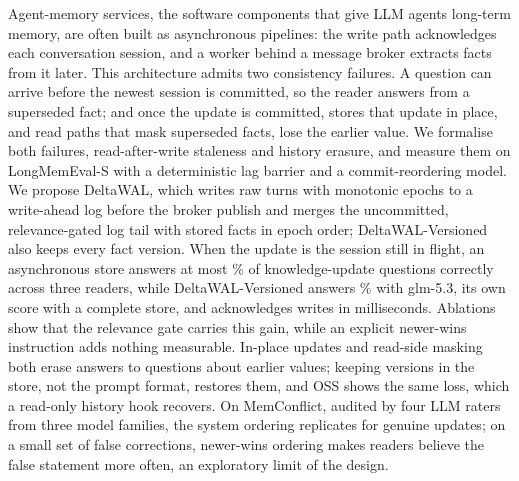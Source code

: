 Agent-memory services, the software components that give LLM agents long-term memory, are often built as asynchronous pipelines: the write path acknowledges each conversation session, and a worker behind a message broker extracts facts from it later. This architecture admits two consistency failures. A question can arrive before the newest session is committed, so the reader answers from a superseded fact; and once the update is committed, stores that update in place, and read paths that mask superseded facts, lose the earlier value. We formalise both failures, read-after-write staleness and history erasure, and measure them on LongMemEval-S with a deterministic lag barrier and a commit-reordering model. We propose DeltaWAL, which writes raw turns with monotonic epochs to a write-ahead log before the broker publish and merges the uncommitted, relevance-gated log tail with stored facts in epoch order; DeltaWAL-Versioned also keeps every fact version. When the update is the session still in flight, an asynchronous store answers at most \% of knowledge-update questions correctly across three readers, while DeltaWAL-Versioned answers \% with glm-5.3, its own score with a complete store, and acknowledges writes in milliseconds. Ablations show that the relevance gate carries this gain, while an explicit newer-wins instruction adds nothing measurable. In-place updates and read-side masking both erase answers to questions about earlier values; keeping versions in the store, not the prompt format, restores them, and \memzero{} OSS  shows the same loss, which a read-only history hook recovers. On MemConflict, audited by four LLM raters from three model families, the system ordering replicates for genuine updates; on a small set of false corrections, newer-wins ordering makes readers believe the false statement more often, an exploratory limit of the design.
